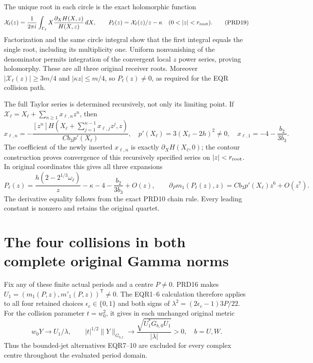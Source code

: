 The unique root in each circle is the exact holomorphic function
\[
 \mathcal X_\ell(z)=\frac1{2\pi i}
       \int_{\Gamma_\ell}
             X\frac{\partial_XH(X,z)}{H(X,z)}\,dX,
 \qquad
 P_\ell(z)=\mathcal X_\ell(z)/z-\kappa
                    \quad(0<|z|<r_{\rm root}).
 \tag{PRD19}
\]
Factorization and the same circle integral show that the first
integral equals the single root, including its multiplicity one.
Uniform nonvanishing of the denominator permits integration of
the convergent local $z$ power series, proving holomorphy.
These are all three original receiver roots. Moreover
$|\mathcal X_\ell(z)|\ge3m/4$ and $|\kappa z|\le m/4$,
so $P_\ell(z)\ne0$, as required for the EQR collision path.

The full Taylor series is determined recursively, not only its
limiting point. If $\mathcal X_\ell=X_\ell+\sum_{n\ge1}x_{\ell,n}z^n$,
then
\[
 x_{\ell,n}=-\frac{[z^n]H(X_\ell+
                     \sum_{j=1}^{n-1}x_{\ell,j}z^j,z)}
                    {Cb_3p'(X_\ell)},\quad
 p'(X_\ell)=3(X_\ell-2h)^2\ne0,
 \quad x_{\ell,1}=-4-\frac{b_2}{3b_3}.
 \tag{PRD20}
\]
The coefficient of the newly inserted $x_{\ell,n}$ is exactly
$\partial_XH(X_\ell,0)$; the contour construction proves convergence
of this recursively specified series on $|z|<r_{\rm root}$.
In original coordinates this gives all three expansions
\[
 P_\ell(z)=\frac{h(2-2^{1/3}\omega_\ell)}z
       -\kappa-4-\frac{b_2}{3b_3}+O(z),\qquad
 \partial_Pm_1(P_\ell(z),z)
       =Cb_3p'(X_\ell)z^6+O(z^7).
 \tag{PRD21}
\]
The derivative equality follows from the exact PRD10 chain rule.
Every leading constant is nonzero and retains the original quartet.

\section{The four collisions in both complete original Gamma norms}
Fix any of these finite actual periods and a centre $P\ne0$.
PRD16 makes $U_1=(m_1(P,z),m'_1(P,z))^{\mathsf T}\ne0$.
The EQR1--6 calculation therefore applies to all four retained
choices $\epsilon_c\in\{0,1\}$ and both signs of
$\lambda^2=(2\epsilon_c-1)3P/22$. For the collision parameter
$t=w_0^2$, it gives in each unchanged original metric
\[
 w_0Y\longrightarrow U_1/\lambda,\qquad
 |t|^{1/2}\|Y\|_{G_{b,t}}
       \longrightarrow\frac{\sqrt{U_1^*G_{b,0}U_1}}{|\lambda|}>0,
                \quad b=U,W.
 \tag{PRD22}
\]
Thus the bounded-jet alternatives EQR7--10 are excluded for every
complex centre throughout the evaluated period domain.

